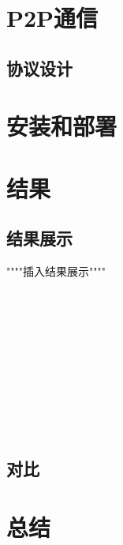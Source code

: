 \documentclass[15pt]{ctexart}
\begin{document}
	
	\section{P2P通信} %
	\label{sec:p2p通信}
		\subsection{协议设计} %
	    \label{sub:协议设计}



	\section{安装和部署} %
	\label{sec:安装和部署}
	
    
    \section{结果} %
    \label{sec:结果}
    	\subsection{结果展示} %
    	\label{sub:结果展示}
    	\par """"插入结果展示""""
    	\\
    	\\
    	\\
    	\\
    	\\
    	\\
    	\\
    	\\
    	\\
    	\\
    	\\
    	\subsection{对比} %
    	\label{sub:对比}
    	

    \section{总结} %
    \label{sec:总结}
    
\end{document}

